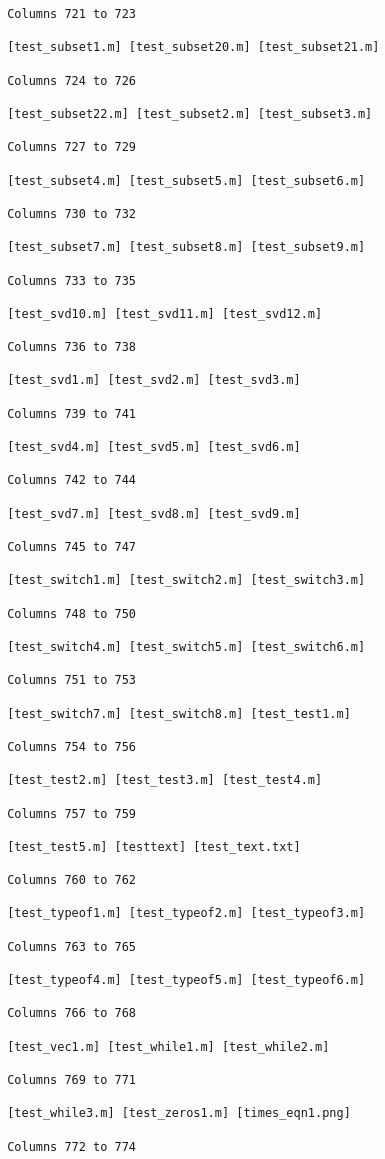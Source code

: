 \begin{verbatim}
 Columns 721 to 723

 [test_subset1.m] [test_subset20.m] [test_subset21.m] 

 Columns 724 to 726

 [test_subset22.m] [test_subset2.m] [test_subset3.m] 

 Columns 727 to 729

 [test_subset4.m] [test_subset5.m] [test_subset6.m] 

 Columns 730 to 732

 [test_subset7.m] [test_subset8.m] [test_subset9.m] 

 Columns 733 to 735

 [test_svd10.m] [test_svd11.m] [test_svd12.m] 

 Columns 736 to 738

 [test_svd1.m] [test_svd2.m] [test_svd3.m] 

 Columns 739 to 741

 [test_svd4.m] [test_svd5.m] [test_svd6.m] 

 Columns 742 to 744

 [test_svd7.m] [test_svd8.m] [test_svd9.m] 

 Columns 745 to 747

 [test_switch1.m] [test_switch2.m] [test_switch3.m] 

 Columns 748 to 750

 [test_switch4.m] [test_switch5.m] [test_switch6.m] 

 Columns 751 to 753

 [test_switch7.m] [test_switch8.m] [test_test1.m] 

 Columns 754 to 756

 [test_test2.m] [test_test3.m] [test_test4.m] 

 Columns 757 to 759

 [test_test5.m] [testtext] [test_text.txt] 

 Columns 760 to 762

 [test_typeof1.m] [test_typeof2.m] [test_typeof3.m] 

 Columns 763 to 765

 [test_typeof4.m] [test_typeof5.m] [test_typeof6.m] 

 Columns 766 to 768

 [test_vec1.m] [test_while1.m] [test_while2.m] 

 Columns 769 to 771

 [test_while3.m] [test_zeros1.m] [times_eqn1.png] 

 Columns 772 to 774


\end{verbatim}
